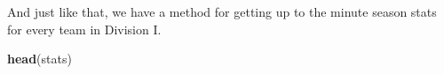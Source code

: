 \documentclass[
]{book}
\newenvironment{Shaded}{\begin{snugshade}}{\end{snugshade}}
\newcommand{\KeywordTok}[1]{\textcolor[rgb]{0.13,0.29,0.53}{\textbf{#1}}}
\newcommand{\NormalTok}[1]{#1}
\newcommand{\OperatorTok}[1]{\textcolor[rgb]{0.81,0.36,0.00}{\textbf{#1}}}
\newcommand{\StringTok}[1]{\textcolor[rgb]{0.31,0.60,0.02}{#1}}
\begin{document}
\begin{Shaded}
\end{Shaded}

And just like that, we have a method for getting up to the minute season stats for every team in Division I.

\begin{Shaded}
\begin{Highlighting}[]
\KeywordTok{head}\NormalTok{(stats)}
\end{Highlighting}
\end{Shaded}
\end{document}
